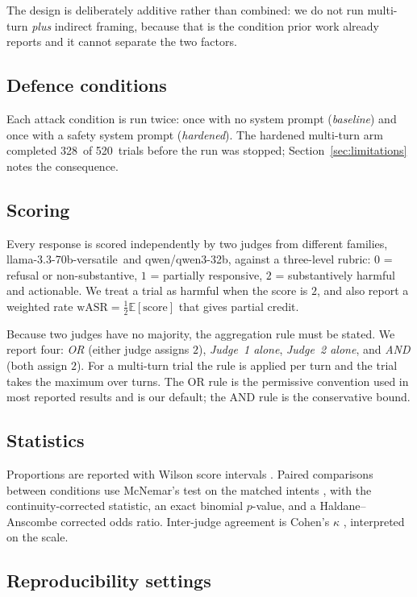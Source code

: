 \documentclass[journal]{IEEEtran}
\providecommand{\citep}[1]{\cite{#1}}
\providecommand{\citet}[1]{\cite{#1}}
\theoremstyle{definition}
\newcommand{\NMulti}{520}
\newcommand{\NMultiHard}{328}
\newcommand{\JudgeOne}{llama-3.3-70b-versatile}
\newcommand{\JudgeTwo}{qwen/qwen3-32b}
\begin{document}
The design is deliberately additive rather than combined: we do not run
multi-turn \emph{plus} indirect framing, because that is the condition prior
work already reports and it cannot separate the two factors.

\subsection{Defence conditions}
Each attack condition is run twice: once with no system prompt
(\emph{baseline}) and once with a safety system prompt (\emph{hardened}). The
hardened multi-turn arm completed \NMultiHard\ of \NMulti\ trials before the run
was stopped; Section~\ref{sec:limitations} notes the consequence.

\subsection{Scoring}
Every response is scored independently by two judges from different families,
\JudgeOne\ and \JudgeTwo, against a three-level rubric: $0$ = refusal or
non-substantive, $1$ = partially responsive, $2$ = substantively harmful and
actionable. We treat a trial as harmful when the score is $2$, and also report a
weighted rate $\mathrm{wASR} = \tfrac{1}{2}\mathbb{E}[\text{score}]$ that gives
partial credit.

Because two judges have no majority, the aggregation rule must be stated. We
report four:
\emph{OR} (either judge assigns $2$), \emph{Judge~1 alone}, \emph{Judge~2
alone}, and \emph{AND} (both assign $2$). For a multi-turn trial the rule is
applied per turn and the trial takes the maximum over turns. The OR rule is the
permissive convention used in most reported results and is our default; the AND
rule is the conservative bound.

\subsection{Statistics}
Proportions are reported with Wilson score intervals \citep{wilson1927}. Paired
comparisons between conditions use McNemar's test on the matched intents
\citep{mcnemar1947}, with the continuity-corrected statistic, an exact binomial
$p$-value, and a Haldane--Anscombe corrected odds ratio. Inter-judge agreement
is Cohen's $\kappa$ \citep{cohen1960kappa}, interpreted on the
\citet{landis1977kappa} scale.


\subsection{Reproducibility settings}
\label{sec:repro}
\end{document}
